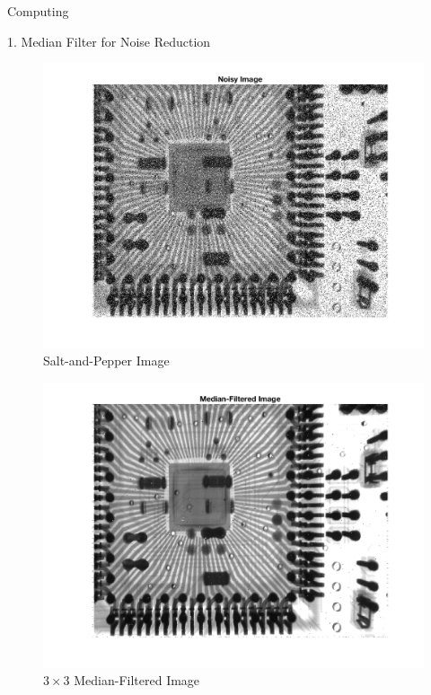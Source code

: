 \begin{section}{Computing}
\begin{homeworkSection}{1. Median Filter for Noise Reduction}
{\begin{minipage}{0.5\textwidth}
\begin{figure}[H]
        \includegraphics[trim={0cm 1.5cm 1cm 0.5cm},clip,width=1.0\columnwidth]{../data/im_noise}
        \caption{Salt-and-Pepper Image}
        \label{fig:im_noise}
        \end{figure}
    \end{minipage}
    \begin{minipage}{0.5\textwidth}
        \begin{figure}[H]
        \centering
        \includegraphics[trim={0cm 1.5cm 1cm 0.5cm},clip,width=1.0\columnwidth]{../data/im_filt}
        \caption{$3 \times 3$ Median-Filtered Image}
        \label{fig:im_filt}
        \end{figure}
    \end{minipage}
}
\end{homeworkSection}
\end{section}
